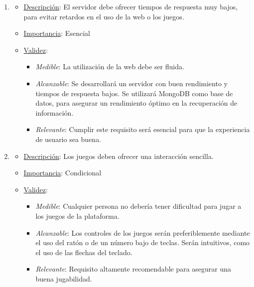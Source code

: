 \begin{enumerate}
\item %
  \begin{itemize}
  \item \underline{Descripción}: El servidor debe ofrecer tiempos de respuesta muy bajos, para evitar retardos en el uso de la web o los juegos.
  \item \underline{Importancia}: Esencial
  \item \underline{Validez}:
    \begin{itemize}
    \item \textit{Medible}: La utilización de la web debe ser fluida.
    \item \textit{Alcanzable}: Se desarrollará un servidor con buen rendimiento y tiempos de respuesta bajos. Se utilizará MongoDB como base de datos, para asegurar un rendimiento óptimo en la recuperación de información.
    \item \textit{Relevante}: Cumplir este requisito será esencial para que la experiencia de usuario sea buena.
    \end{itemize}
  \end{itemize}

\item %
  \begin{itemize}
  \item \underline{Descripción}: Los juegos deben ofrecer una interacción sencilla.
  \item \underline{Importancia}: Condicional
  \item \underline{Validez}:
    \begin{itemize}
    \item \textit{Medible}: Cualquier persona no debería tener dificultad para jugar a los juegos de la plataforma.
    \item \textit{Alcanzable}: Los controles de los juegos serán preferiblemente mediante el uso del ratón o de un número bajo de teclas. Serán intuitivos, como el uso de las flechas del teclado.
    \item \textit{Relevante}: Requisito altamente recomendable para asegurar una buena  jugabilidad.
    \end{itemize}
  \end{itemize}


\end{enumerate}
